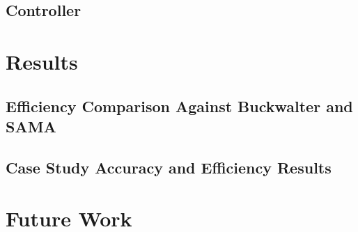 \documentclass[11pt,letterpaper]{article}
\begin{document}
\subsection{Controller}


\section{Results}
\label{sec:results}

\subsection{Efficiency Comparison Against Buckwalter and SAMA}

\subsection{Case Study Accuracy and Efficiency Results}


\section{Future Work}




\end{document}
